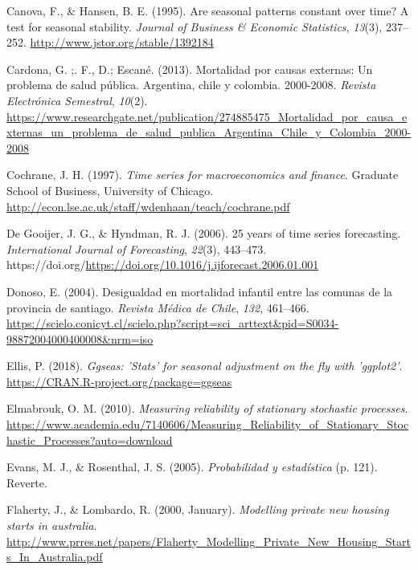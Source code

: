 \documentclass[
]{article}
\newlength{\cslhangindent}
\newlength{\cslentryspacingunit} %
\newenvironment{CSLReferences}[2] %
 {%
  \setlength{\parindent}{0pt}
  \ifodd #1
  \let\oldpar\par
  \def\par{\hangindent=\cslhangindent\oldpar}
  \fi
  \setlength{\parskip}{#2\cslentryspacingunit}
 }%
 {}
\begin{document}
\begin{CSLReferences}{1}{0}
\leavevmode{}%
Canova, F., \& Hansen, B. E. (1995). Are seasonal patterns constant over
time? A test for seasonal stability. \emph{Journal of Business \&
Economic Statistics}, \emph{13}(3), 237--252.
\url{http://www.jstor.org/stable/1392184}

\leavevmode{}%
Cardona, G. ;. F., D.; Escané. (2013). Mortalidad por causas externas:
Un problema de salud pública. Argentina, chile y colombia. 2000-2008.
\emph{Revista Electrónica Semestral}, \emph{10}(2).
\url{https://www.researchgate.net/publication/274885475_Mortalidad_por_causa_externas_un_problema_de_salud_publica_Argentina_Chile_y_Colombia_2000-2008}

\leavevmode{}%
Cochrane, J. H. (1997). \emph{Time series for macroeconomics and
finance}. Graduate School of Business, University of Chicago.
\url{http://econ.lse.ac.uk/staff/wdenhaan/teach/cochrane.pdf}

\leavevmode{}%
De Gooijer, J. G., \& Hyndman, R. J. (2006). 25 years of time series
forecasting. \emph{International Journal of Forecasting}, \emph{22}(3),
443--473.
https://doi.org/\url{https://doi.org/10.1016/j.ijforecast.2006.01.001}

\leavevmode{}%
Donoso, E. (2004). Desigualdad en mortalidad infantil entre las comunas
de la provincia de santiago. \emph{Revista Médica de Chile}, \emph{132},
461--466.
\url{https://scielo.conicyt.cl/scielo.php?script=sci_arttext\&pid=S0034-98872004000400008\&nrm=iso}

\leavevmode{}%
Ellis, P. (2018). \emph{Ggseas: 'Stats' for seasonal adjustment on the
fly with 'ggplot2'}. \url{https://CRAN.R-project.org/package=ggseas}

\leavevmode{}%
Elmabrouk, O. M. (2010). \emph{Measuring reliability of stationary
stochastic processes}.
\url{https://www.academia.edu/7140606/Measuring_Reliability_of_Stationary_Stochastic_Processes?auto=download}

\leavevmode{}%
Evans, M. J., \& Rosenthal, J. S. (2005). \emph{Probabilidad y
estadística} (p. 121). Reverte.

\leavevmode{}%
Flaherty, J., \& Lombardo, R. (2000, January). \emph{Modelling private
new housing starts in australia}.
\url{http://www.prres.net/papers/Flaherty_Modelling_Private_New_Housing_Starts_In_Australia.pdf}


\end{CSLReferences}
\end{document}
